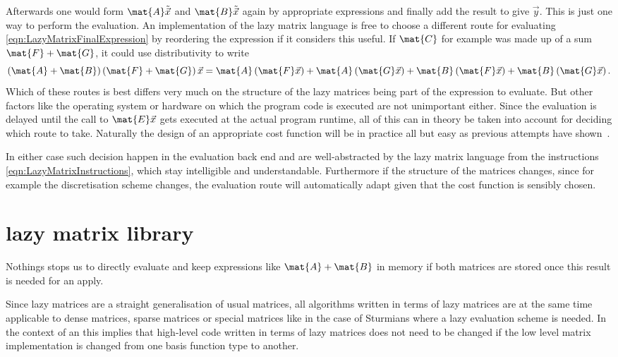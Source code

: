 Afterwards one would form $\mat{A} \tilde{\vec{x}}$ and $\mat{B} \tilde{\vec{x}}$
again by appropriate \contraction expressions
and finally add the result to give $\vec{y}$.
This is just one way to perform the evaluation.
An implementation of the lazy matrix language is free to choose
a different route for evaluating \eqref{eqn:LazyMatrixFinalExpression}
by reordering the expression if it considers this useful.
If $\mat{C}$ for example was made up of a sum $\mat{F} + \mat{G}$,
it could use distributivity to write
\[ \left( \mat{A} + \mat{B} \right) \left( \mat{F} + \mat{G} \right) \vec{x}
	= \mat{A} \left( \mat{F} \vec{x} \right) + \mat{A} \left( \mat{G}\vec{x}\right)
	+ \mat{B} \left( \mat{F} \vec{x} \right) + \mat{B} \left( \mat{G}\vec{x}\right).
\]
Which of these routes is best differs very much on the structure
of the lazy matrices being part of the expression to evaluate.
But other factors like the operating system or hardware on which
the program code is executed are not unimportant either.
Since the evaluation is delayed
until the call to $\mat{E}\vec{x}$ gets executed at the actual program runtime,
all of this can in theory be taken into account for deciding
which route to take.
Naturally the design of an appropriate cost function
will be in practice all but easy
as previous attempts have shown~.

In either case such decision happen in the evaluation back end
and are well-abstracted by the lazy matrix language
from the instructions \eqref{eqn:LazyMatrixInstructions},
which stay intelligible and understandable.
Furthermore if the structure of the matrices changes,
since for example the discretisation scheme changes,
the evaluation route will automatically adapt
given that the cost function is sensibly chosen.

\section{\lazyten lazy matrix library}




Nothings stops us to directly evaluate and keep expressions like $\mat{A} + \mat{B}$
in memory if both matrices are stored once this result is needed for an apply.

Since lazy matrices are a straight generalisation of usual matrices,
all algorithms written in terms of lazy matrices
are at the same time applicable to dense matrices,
sparse matrices or special matrices like in the case of Sturmians
where a lazy evaluation scheme is needed.
In the context of an \SCF this implies that high-level code
written in terms of lazy matrices
does not need to be changed if the low level matrix implementation
is changed from one basis function type to another.






